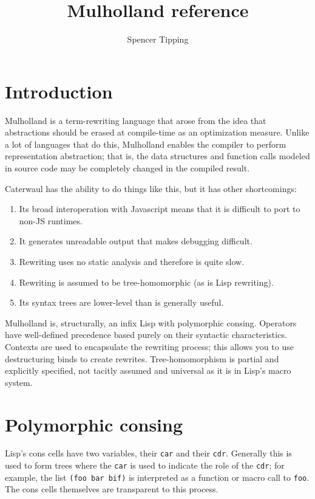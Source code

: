 \documentclass{report}
\title{Mulholland reference}
\author{Spencer Tipping}
\begin{document}
\maketitle{}
\tableofcontents{}

\chapter{Introduction}
  Mulholland is a term-rewriting language that arose from the idea that abstractions should be erased at compile-time as an optimization measure. Unlike a lot of languages that do this,
  Mulholland enables the compiler to perform representation abstraction; that is, the data structures and function calls modeled in source code may be completely changed in the compiled
  result.

  Caterwaul has the ability to do things like this, but it has other shortcomings:

\begin{enumerate}
\item{Its broad interoperation with Javascript means that it is difficult to port to non-JS runtimes.}
\item{It generates unreadable output that makes debugging difficult.}
\item{Rewriting uses no static analysis and therefore is quite slow.}
\item{Rewriting is assumed to be tree-homomorphic (as is Lisp rewriting).}
\item{Its syntax trees are lower-level than is generally useful.}
\end{enumerate}

  Mulholland is, structurally, an infix Lisp with polymorphic consing. Operators have well-defined precedence based purely on their syntactic characteristics. Contexts are used to encapsulate
  the rewriting process; this allows you to use destructuring binds to create rewrites. Tree-homomorphism is partial and explicitly specified, not tacitly assumed and universal as it is in
  Lisp's macro system.

\chapter{Polymorphic consing}
  Lisp's cons cells have two variables, their {\tt car} and their {\tt cdr}. Generally this is used to form trees where the {\tt car} is used to indicate the role of the {\tt cdr}; for
  example, the list {\tt (foo bar bif)} is interpreted as a function or macro call to {\tt foo}. The cons cells themselves are transparent to this process.
\end{document}
